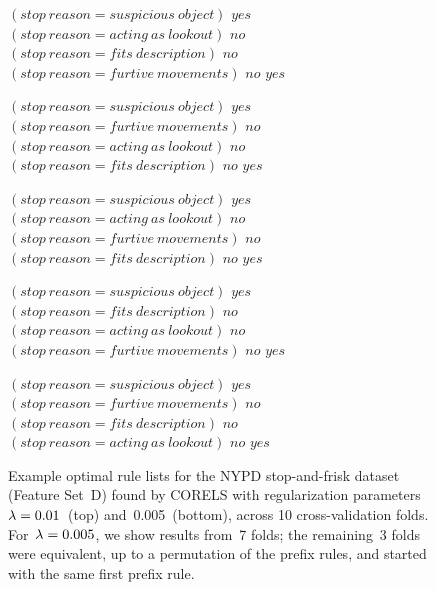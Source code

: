 \begin{figure}[b!]
\begin{algorithmic}
\State \bif $(stop~reason = suspicious~object)$ \bthen $yes$ 
\State \belif $(stop~reason = acting~as~lookout)$ \bthen $no$
\State \belif $(stop~reason = fits~description)$ \bthen $no$
\State \belif $(stop~reason = furtive~movements)$ \bthen $no$
\State \belse $yes$
\end{algorithmic}
\vspace{1mm}
\begin{algorithmic}
\State \bif $(stop~reason = suspicious~object)$ \bthen $yes$ 
\State \belif $(stop~reason = furtive~movements)$ \bthen $no$
\State \belif $(stop~reason = acting~as~lookout)$ \bthen $no$
\State \belif $(stop~reason = fits~description)$ \bthen $no$
\State \belse $yes$
\end{algorithmic}
\vspace{1mm}
\begin{algorithmic}
\State \bif $(stop~reason = suspicious~object)$ \bthen $yes$ 
\State \belif $(stop~reason = acting~as~lookout)$ \bthen $no$
\State \belif $(stop~reason = furtive~movements)$ \bthen $no$
\State \belif $(stop~reason = fits~description)$ \bthen $no$
\State \belse $yes$
\end{algorithmic}
\begin{algorithmic}
\vspace{1mm}
\State \bif $(stop~reason = suspicious~object)$ \bthen $yes$ 
\State \belif $(stop~reason = fits~description)$ \bthen $no$
\State \belif $(stop~reason = acting~as~lookout)$ \bthen $no$
\State \belif $(stop~reason = furtive~movements)$ \bthen $no$
\State \belse $yes$
\end{algorithmic}
\vspace{1mm}
\begin{algorithmic}
\State \bif $(stop~reason = suspicious~object)$ \bthen $yes$ 
\State \belif $(stop~reason = furtive~movements)$ \bthen $no$
\State \belif $(stop~reason = fits~description)$ \bthen $no$
\State \belif $(stop~reason = acting~as~lookout)$ \bthen $no$
\State \belse $yes$
\end{algorithmic}
\caption{Example optimal rule lists for the NYPD stop-and-frisk dataset (Feature Set~D)
found by CORELS with regularization parameters~${{\lambda} = 0.01}$~(top) and~0.005~(bottom),
across 10 cross-validation folds.
%
For~${{\lambda} = 0.005}$, we show results from~7 folds; the remaining~3 folds were equivalent,
up to a permutation of the prefix rules, and started with the same first prefix rule.
}
\label{fig:cpw-noloc-rule-list}
\end{figure}

